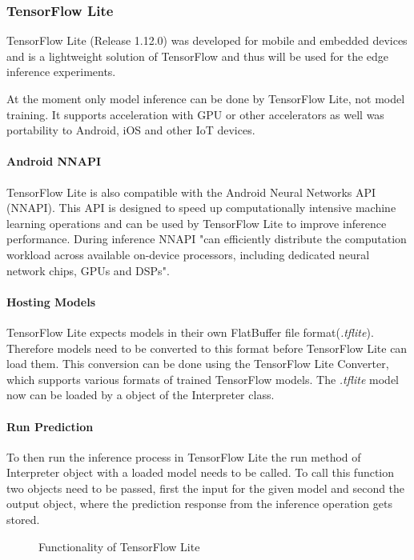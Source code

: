 \subsubsection{TensorFlow Lite}
\label{chap:TFLite}
TensorFlow Lite (Release 1.12.0) was developed for mobile and embedded devices and is a lightweight solution of TensorFlow and thus will be used for the edge inference experiments.

At the moment only model inference can be done by TensorFlow Lite, not model training.
It supports acceleration with GPU or other accelerators as well was portability to Android, iOS and other IoT devices.

\paragraph{Android NNAPI}
\label{chap:NNAPI}
TensorFlow Lite is also compatible with the Android Neural Networks API (NNAPI). This API
is designed to speed up computationally intensive machine learning operations and can be used by TensorFlow Lite to improve inference performance. During inference NNAPI "can
efficiently distribute the computation workload across available on-device processors, including dedicated neural network chips, GPUs and DSPs"\cite{DBLP:journals/corr/abs-1810-01109}.



\paragraph{Hosting Models}
TensorFlow Lite expects models in their own FlatBuffer file  format(\emph{.tflite}). Therefore models need to be converted to this format before TensorFlow Lite can load them. This conversion can be done using the TensorFlow Lite Converter, which supports various formats of trained TensorFlow models.
The \emph{.tflite} model now can be loaded by a object of the Interpreter class.
\paragraph{Run Prediction}

To then run the inference process in TensorFlow Lite the run method of Interpreter object with a loaded model needs to be called. To call this function two objects need to be passed, first the input for the given model and second the output object, where the prediction response from the inference operation gets stored. 
\begin{figure}[H]
\centering

\caption{Functionality of TensorFlow Lite}
\label{fig:edge}
\end{figure}
